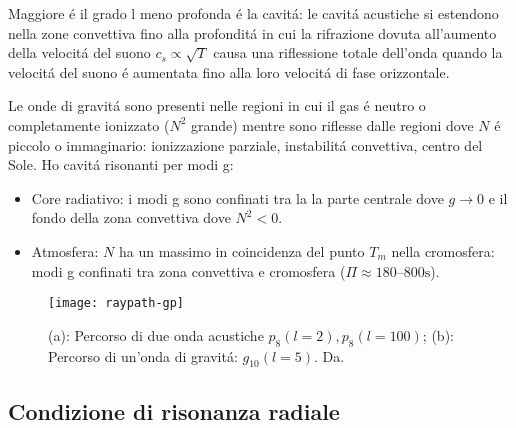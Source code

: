 \documentclass[../main.tex]{subfiles}
\begin{document}
Maggiore \'e il grado l meno profonda \'e la cavit\'a: le cavit\'a acustiche si estendono nella zone convettiva fino alla profondit\'a in cui la rifrazione dovuta all'aumento della velocit\'a del suono $c_s\propto\sqrt{T}$ causa una riflessione totale dell'onda quando la velocit\'a del suono \'e aumentata fino alla loro velocit\'a di fase orizzontale.


Le onde di gravit\'a sono presenti nelle regioni in cui il gas \'e neutro o completamente ionizzato ($N^2$ grande) mentre sono riflesse dalle regioni dove $N$ \'e piccolo o immaginario: ionizzazione parziale, instabilit\'a convettiva, centro del Sole.
Ho cavit\'a risonanti per modi g:
\begin{itemize}
\item Core radiativo: i modi g sono confinati tra la la parte centrale dove $g\to0$ e il fondo della zona convettiva dove $N^2<0$.
\item Atmosfera: $N$ ha un massimo in coincidenza del punto $T_m$ nella cromosfera: modi g confinati tra zona convettiva e cromosfera ($\Pi\approx\numrange{180}{800}\si{\second}$).
\end{itemize}

\begin{figure}
\texttt{[image: raypath-gp]}
\caption{(a): Percorso di due onda acustiche $p_8(l=2), p_8(l=100)$; (b): Percorso di un'onda di gravit\'a: $g_{10}(l=5)$. Da\cite{gou91seismic}.}
\end{figure}

\subsection{Condizione di risonanza radiale}
\end{document}
